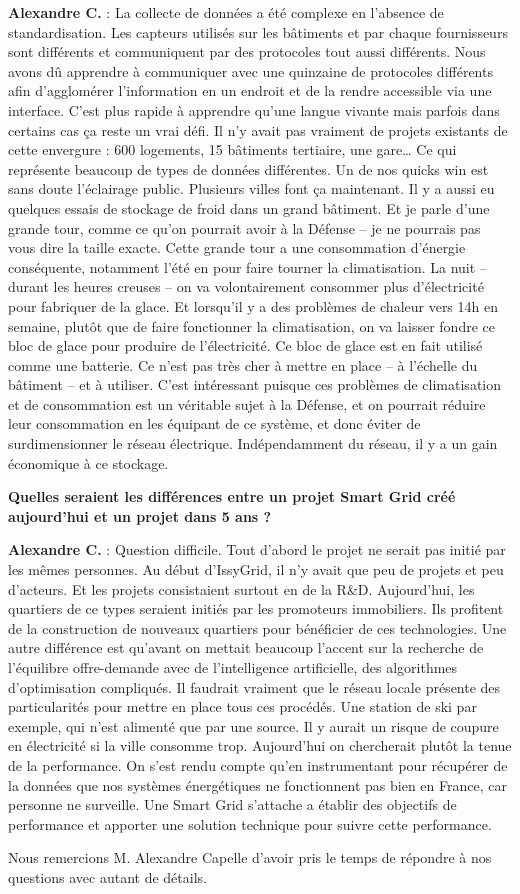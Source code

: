 \textbf{Alexandre C.} :
La collecte de données a été complexe en l’absence de standardisation.
Les capteurs utilisés sur les bâtiments et par chaque fournisseurs sont différents et communiquent par des protocoles tout aussi différents.
Nous avons dû apprendre à communiquer avec une quinzaine de protocoles différents afin d’agglomérer l’information en un endroit
et de la rendre accessible via une interface.
C’est plus rapide à apprendre qu’une langue vivante mais parfois dans certains cas ça reste un vrai défi.
Il n’y avait pas vraiment de projets existants de cette envergure : 600 logements, 15 bâtiments tertiaire, une gare…
Ce qui représente beaucoup de types de données différentes.
Un de nos quicks win est sans doute l’éclairage public. Plusieurs villes font ça maintenant.
Il y a aussi eu quelques essais de stockage de froid dans un grand bâtiment.
Et je parle d’une grande tour, comme ce qu’on pourrait avoir à la Défense – je ne pourrais pas vous dire la taille exacte.
Cette grande tour a une consommation d’énergie conséquente, notamment l’été en pour faire tourner la climatisation.
La nuit – durant les heures creuses – on va volontairement consommer plus d’électricité pour fabriquer de la glace.
Et lorsqu’il y a des problèmes de chaleur vers 14h en semaine, plutôt que de faire fonctionner la climatisation,
on va laisser fondre ce bloc de glace pour produire de l’électricité. Ce bloc de glace est en fait utilisé comme une batterie.
Ce n’est pas très cher à mettre en place – à l’échelle du bâtiment – et à utiliser.
C’est intéressant puisque ces problèmes de climatisation et de consommation est un véritable sujet à la Défense,
et on pourrait réduire leur consommation en les équipant de ce système, et donc éviter de surdimensionner le réseau électrique.
Indépendamment du réseau, il y a un gain économique à ce stockage.

\textbf{Quelles seraient les différences entre un projet Smart Grid créé aujourd’hui et un projet dans 5 ans ?}

\textbf{Alexandre C.} :
Question difficile. Tout d'abord le projet ne serait pas initié par les mêmes personnes.
Au début d’IssyGrid, il n’y avait que peu de projets et peu d’acteurs. Et les projets consistaient surtout en de la R\&D.
Aujourd’hui, les quartiers de ce types seraient initiés par les promoteurs immobiliers.
Ils profitent de la construction de nouveaux quartiers pour bénéficier de ces technologies.
Une autre différence est qu’avant on mettait beaucoup l’accent sur la recherche de l’équilibre offre-demande avec de l’intelligence artificielle,
des algorithmes d’optimisation compliqués.
Il faudrait vraiment que le réseau locale présente des particularités pour mettre en place tous ces procédés.
Une station de ski par exemple, qui n’est alimenté que par une source.
Il y aurait un risque de coupure en électricité si la ville consomme trop.
Aujourd’hui on chercherait plutôt la tenue de la performance.
On s’est rendu compte qu’en instrumentant pour récupérer de la données que nos systèmes énergétiques
ne fonctionnent pas bien en France, car personne ne surveille.
Une Smart Grid s’attache a établir des objectifs de performance et apporter une solution technique pour suivre cette performance.

Nous remercions M. Alexandre Capelle d'avoir pris le temps de répondre à nos questions avec autant de détails.